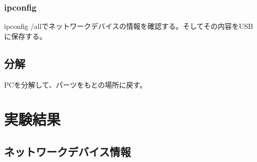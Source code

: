 \documentclass[10pt]{article}
\begin{document}
\subsubsection{ipconfig}
	ipconfig /allでネットワークデバイスの情報を確認する。そしてその内容をUSBに保存する。

\subsection{分解}
\hspace{1cm}PCを分解して、パーツをもとの場所に戻す。

	
\pagebreak

\section{実験結果}
\subsection{ネットワークデバイス情報}
 \noindent\makebox[\linewidth]{\rule{\paperwidth}{0.4pt}}
 
\end{document}
